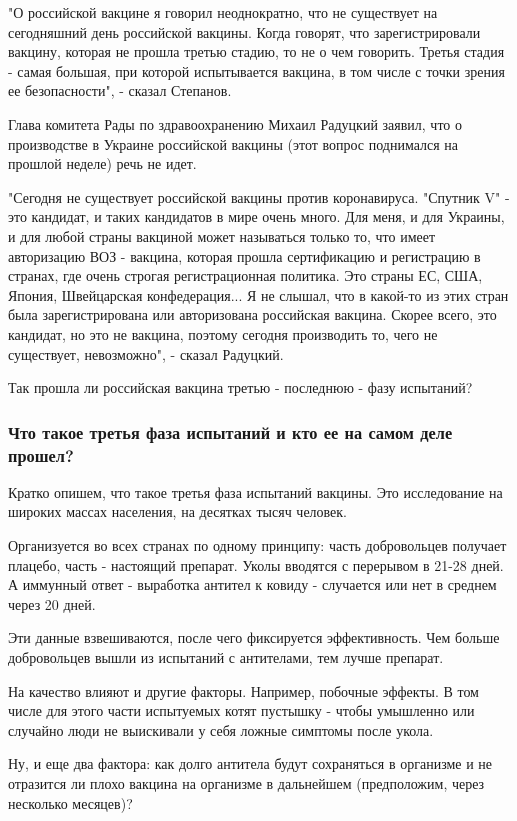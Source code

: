 "О российской вакцине я говорил неоднократно, что не существует на сегодняшний
день российской вакцины. Когда говорят, что зарегистрировали вакцину, которая
не прошла третью стадию, то не о чем говорить. Третья стадия - самая большая,
при которой испытывается вакцина, в том числе с точки зрения ее безопасности",
- сказал Степанов. 

Глава комитета Рады по здравоохранению Михаил Радуцкий заявил, что о
производстве в Украине российской вакцины (этот вопрос поднимался на прошлой
неделе) речь не идет. 

"Сегодня не существует российской вакцины против коронавируса. "Спутник V" -
это кандидат, и таких кандидатов в мире очень много. Для меня, и для Украины, и
для любой страны вакциной может называться только то, что имеет авторизацию ВОЗ
- вакцина, которая прошла сертификацию и регистрацию в странах, где очень
строгая регистрационная политика. Это страны ЕС, США, Япония, Швейцарская
конфедерация... Я не слышал, что в какой-то из этих стран была зарегистрирована
или авторизована российская вакцина. Скорее всего, это кандидат, но это не
вакцина, поэтому сегодня производить то, чего не существует, невозможно", -
сказал Радуцкий.

Так прошла ли российская вакцина третью - последнюю - фазу испытаний? 

\subsubsection{Что такое третья фаза испытаний и кто ее на самом деле прошел? }

Кратко опишем, что такое третья фаза испытаний вакцины. Это исследование на
широких массах населения, на десятках тысяч человек.

Организуется во всех странах по одному принципу: часть добровольцев получает
плацебо, часть - настоящий препарат. Уколы вводятся с перерывом в 21-28 дней. А
иммунный ответ - выработка антител к ковиду - случается или нет в среднем через
20 дней. 

Эти данные взвешиваются, после чего фиксируется эффективность. Чем больше
добровольцев вышли из испытаний с антителами, тем лучше препарат.

На качество влияют и другие факторы. Например, побочные эффекты. В том числе
для этого части испытуемых котят пустышку - чтобы умышленно или случайно люди
не выискивали у себя ложные симптомы после укола.

Ну, и еще два фактора: как долго антитела будут сохраняться в организме и не
отразится ли плохо вакцина на организме в дальнейшем (предположим, через
несколько месяцев)?

